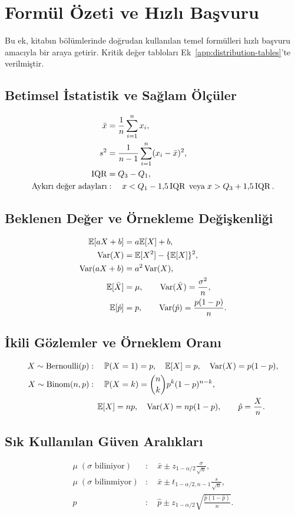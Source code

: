 \chapter{Formül Özeti ve Hızlı Başvuru}
\label{app:formulas}
Bu ek, kitabın bölümlerinde doğrudan kullanılan temel formülleri hızlı
başvuru amacıyla bir araya getirir. Kritik değer tabloları
Ek~\ref{app:distribution-tables}'te verilmiştir.


\section{Betimsel İstatistik ve Sağlam Ölçüler}
\begin{align*}
\bar{x} &= \frac{1}{n}\sum_{i=1}^{n}x_i, \\
s^2 &= \frac{1}{n-1}\sum_{i=1}^{n}(x_i-\bar{x})^2, \\
\operatorname{IQR} &= Q_3-Q_1, \\
\text{Aykırı değer adayları} &: \quad x<Q_1-1{,}5\operatorname{IQR}\; \text{veya}\; x>Q_3+1{,}5\operatorname{IQR}.
\end{align*}

\section{Beklenen Değer ve Örnekleme Değişkenliği}
\begin{align*}
\mathbb{E}[aX+b] &= a\mathbb{E}[X]+b, \\
\operatorname{Var}(X) &= \mathbb{E}[X^2]-\{\mathbb{E}[X]\}^2, \\
\operatorname{Var}(aX+b) &= a^2\operatorname{Var}(X), \\
\mathbb{E}[\bar X] &= \mu, \qquad \operatorname{Var}(\bar X)=\frac{\sigma^2}{n}, \\
\mathbb{E}[\hat p] &= p, \qquad \operatorname{Var}(\hat p)=\frac{p(1-p)}{n}.
\end{align*}

\section{İkili Gözlemler ve Örneklem Oranı}
\begin{align*}
X\sim\mathrm{Bernoulli}(p) &: \quad \mathbb{P}(X=1)=p, \quad \mathbb{E}[X]=p, \quad \operatorname{Var}(X)=p(1-p), \\
X\sim\mathrm{Binom}(n,p) &: \quad \mathbb{P}(X=k)=\binom{n}{k}p^k(1-p)^{n-k}, \\
&\quad \mathbb{E}[X]=np, \quad \operatorname{Var}(X)=np(1-p), \qquad \hat p=\frac{X}{n}.
\end{align*}

\section{Sık Kullanılan Güven Aralıkları}
\begin{align*}
\mu\; (\sigma \text{ biliniyor}) &: \quad \bar{x} \pm z_{1-\alpha/2}\frac{\sigma}{\sqrt{n}}, \\
\mu\; (\sigma \text{ bilinmiyor}) &: \quad \bar{x} \pm t_{1-\alpha/2,n-1}\frac{s}{\sqrt{n}}, \\
p &: \quad \hat{p} \pm z_{1-\alpha/2}\sqrt{\frac{\hat{p}(1-\hat{p})}{n}}.
\end{align*}

